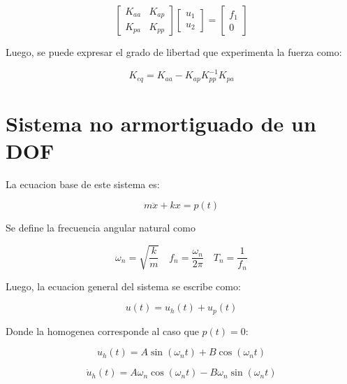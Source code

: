 \documentclass{article}  %
\begin{document}
\begin{equation}
    \begin{bmatrix}
        K_{aa} & K_{ap} \\
        K_{pa} & K_{pp}
    \end{bmatrix}
    \begin{bmatrix}
        u_1 \\
        u_2
    \end{bmatrix}
    =
    \begin{bmatrix}
        f_1 \\
        0
    \end{bmatrix}
\end{equation}

Luego, se puede expresar el grado de libertad que experimenta la fuerza como:

\begin{equation}
    K_{eq} = K_{aa} - K_{ap} K_{pp}^{-1} K_{pa}
\end{equation}

\section{Sistema no armortiguado de un DOF}

La ecuacion base de este sistema es:

\begin{equation}
    m \ddot{x} + kx = p(t)
\end{equation}

Se define la frecuencia angular natural como

\begin{equation}
    \omega_n = \sqrt{\frac{k}{m}} \quad f_n = \frac{\omega_n}{2\pi} \quad T_n = \frac{1}{f_n} 
\end{equation}

Luego, la ecuacion general del sistema se escribe como:

\begin{equation}
    u(t) = u_h(t) + u_p(t)
\end{equation}

Donde la homogenea corresponde al caso que $p(t) = 0$:

\begin{equation}
    u_h(t) = A \sin(\omega_n t) + B \cos(\omega_n t)
\end{equation}

\begin{equation}
    \dot{u}_h(t) = A \omega_n \cos(\omega_n t) - B \omega_n \sin(\omega_n t)
\end{equation}
\end{document}
